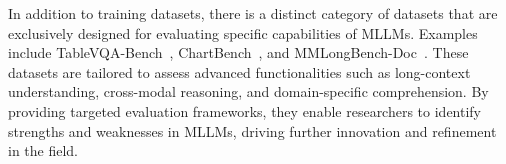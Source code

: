 In addition to training datasets, there is a distinct category of datasets that are exclusively designed for evaluating specific capabilities of MLLMs. Examples include TableVQA-Bench~\cite{Kim2024ARXIV_TableVQA_Bench_A}, ChartBench~\cite{Xu2024ARXIV_ChartBench_A_Benchmark}, and MMLongBench-Doc~\cite{Ma2024NEURIPS_MMLongBench_Doc_Benchmarking}. These datasets are tailored to assess advanced functionalities such as long-context understanding, cross-modal reasoning, and domain-specific comprehension. By providing targeted evaluation frameworks, they enable researchers to identify strengths and weaknesses in MLLMs, driving further innovation and refinement in the field.


%     

%     
